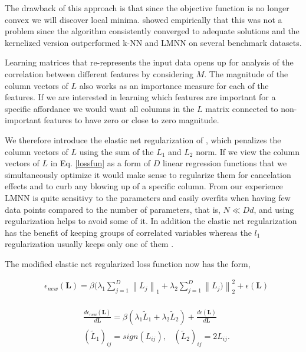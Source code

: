 The drawback of this approach is that since the objective function is no
longer convex we will discover local minima. \cite{Torresani:2006wb}
showed empirically that this was not a problem since the algorithm
consistently converged to adequate solutions and the kernelized version
outperformed k-NN and LMNN on several benchmark datasets.

Learning matrices that re-represents the input data opens up for
analysis of the correlation between different features by considering
\(M\). The magnitude of the column vectors of \(L\) also works as an
importance measure for each of the features. If we are interested in
learning which features are important for a specific affordance we would
want all columns in the \(L\) matrix connected to non-important features
to have zero or close to zero magnitude.

We therefore introduce the elastic net regularization of
\cite{Cimpoi:2015eg}, which penalizes the column vectors of \(L\) using
the sum of the \(L_1\) and \(L_2\) norm. If we view the column vectors
of \(L\) in Eq. \ref{lossfun} as a form of \(D\) linear regression
functions that we simultaneously optimize it would make sense to
regularize them for cancelation effects and to curb any blowing up of a
specific column. From our experience LMNN is quite sensitivy to the
parameters and easily overfits when having few data points compared to
the number of parameters, that is, \(N \ll Dd\), and using
regularization helps to avoid some of it. In addition the elastic net
regularization has the benefit of keeping groups of correlated variables
whereas the \(l_1\) regularization usually keeps only one of them
\cite{Cimpoi:2015eg}.

The modified elastic net regularized loss function now has the form,

\small 

\begin{equation}
\label{lossfun}
\begin{aligned}
& \epsilon_{new}(\mathbf{L}) = \beta(\lambda_1 \sum_{j=1}^{D} \left\lVert L_j  \right\rVert_1 + \lambda_2 \sum_{j=1}^{D} \left\lVert L_j)  \right\rVert_{2}^{2} + \epsilon(\mathbf{L}) \\
\end{aligned}
\end{equation}

\begin{equation}
\label{lossfunderivative}
\begin{aligned}
& \frac{d\epsilon_{new}(\mathbf{L})}{d\mathbf{L}} = \beta(\lambda_1  \tilde{L}_1 + \lambda_2  \tilde{L}_2) + \frac{d\epsilon(\mathbf{L})}{d\mathbf{L}} \\
& (\tilde{L}_1)_{ij} = sign(L_{ij}), \; \; \; (\tilde{L}_2)_{ij} = 2 L_{ij}.
\end{aligned}
\end{equation}


